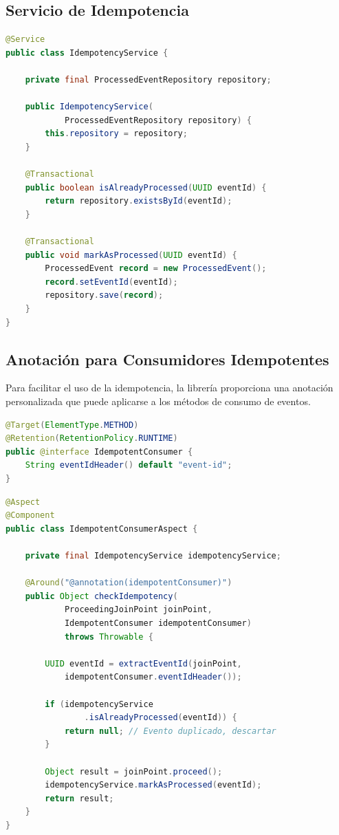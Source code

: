 \subsection{Servicio de Idempotencia}

\begin{lstlisting}[language=Java, caption={Servicio para verificar y registrar eventos procesados.}]
@Service
public class IdempotencyService {

    private final ProcessedEventRepository repository;

    public IdempotencyService(
            ProcessedEventRepository repository) {
        this.repository = repository;
    }

    @Transactional
    public boolean isAlreadyProcessed(UUID eventId) {
        return repository.existsById(eventId);
    }

    @Transactional
    public void markAsProcessed(UUID eventId) {
        ProcessedEvent record = new ProcessedEvent();
        record.setEventId(eventId);
        repository.save(record);
    }
}
\end{lstlisting}

\subsection{Anotación para Consumidores Idempotentes}

Para facilitar el uso de la idempotencia, la librería proporciona una anotación personalizada que puede aplicarse a los métodos de consumo de eventos.

\begin{lstlisting}[language=Java, caption={Anotación personalizada para consumidores idempotentes.}]
@Target(ElementType.METHOD)
@Retention(RetentionPolicy.RUNTIME)
public @interface IdempotentConsumer {
    String eventIdHeader() default "event-id";
}
\end{lstlisting}

\begin{lstlisting}[language=Java, caption={Aspecto que intercepta los consumidores anotados.}]
@Aspect
@Component
public class IdempotentConsumerAspect {

    private final IdempotencyService idempotencyService;

    @Around("@annotation(idempotentConsumer)")
    public Object checkIdempotency(
            ProceedingJoinPoint joinPoint,
            IdempotentConsumer idempotentConsumer)
            throws Throwable {

        UUID eventId = extractEventId(joinPoint,
            idempotentConsumer.eventIdHeader());

        if (idempotencyService
                .isAlreadyProcessed(eventId)) {
            return null; // Evento duplicado, descartar
        }

        Object result = joinPoint.proceed();
        idempotencyService.markAsProcessed(eventId);
        return result;
    }
}
\end{lstlisting}

